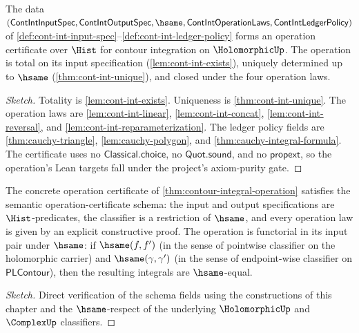 \begin{theorem}
\label{thm:contour-integral-operation}
The data \((\mathsf{ContIntInputSpec}, \mathsf{ContIntOutputSpec}, \hsame, \mathsf{ContIntOperationLaws}, \mathsf{ContIntLedgerPolicy})\) of \autoref{def:cont-int-input-spec}--\autoref{def:cont-int-ledger-policy} forms an operation certificate over \(\Hist\) for contour integration on \(\HolomorphicUp\). The operation is total on its input specification (\autoref{lem:cont-int-exists}), uniquely determined up to \(\hsame\) (\autoref{thm:cont-int-unique}), and closed under the four operation laws.
\end{theorem}
\begin{proof}[Sketch]
Totality is \autoref{lem:cont-int-exists}. Uniqueness is \autoref{thm:cont-int-unique}. The operation laws are \autoref{lem:cont-int-linear}, \autoref{lem:cont-int-concat}, \autoref{lem:cont-int-reversal}, and \autoref{lem:cont-int-reparameterization}. The ledger policy fields are \autoref{thm:cauchy-triangle}, \autoref{lem:cauchy-polygon}, and \autoref{thm:cauchy-integral-formula}. The certificate uses no \(\mathsf{Classical.choice}\), no \(\mathsf{Quot.sound}\), and no \(\mathsf{propext}\), so the operation's Lean targets fall under the project's axiom-purity gate.
\end{proof}

\begin{theorem}
\label{thm:contour-integral-semantic}
The concrete operation certificate of \autoref{thm:contour-integral-operation} satisfies the semantic operation-certificate schema: the input and output specifications are \(\Hist\)-predicates, the classifier is a restriction of \(\hsame\), and every operation law is given by an explicit constructive proof. The operation is functorial in its input pair under \(\hsame\): if \(\hsame(f, f')\) (in the sense of pointwise classifier on the holomorphic carrier) and \(\hsame(\gamma, \gamma')\) (in the sense of endpoint-wise classifier on \(\mathsf{PLContour}\)), then the resulting integrals are \(\hsame\)-equal.
\end{theorem}
\begin{proof}[Sketch]
Direct verification of the schema fields using the constructions of this chapter and the \(\hsame\)-respect of the underlying \(\HolomorphicUp\) and \(\ComplexUp\) classifiers.
\end{proof}

